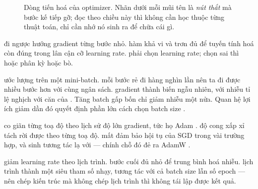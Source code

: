 \documentclass[../../../deep_learning.tex]{subfiles}
\begin{document}
\begin{figure}[H]\centering
{}
\caption{Dòng tiến hoá của optimizer. Nhãn dưới mỗi mũi tên là \emph{nút thắt} mà bước kế tiếp gỡ; đọc theo chiều này thì không cần học thuộc từng thuật toán, chỉ cần nhớ nó sinh ra để chữa cái gì.}
\label{fig:tien-hoa-opt}
\end{figure}

\begin{mach}
\item {} \gp đi ngược hướng gradient từng bước nhỏ. \gd hàm khả vi và trơn đủ để tuyến tính hoá còn đúng trong lân cận cỡ learning rate. \gia phải chọn learning rate; chọn sai thì hoặc phân kỳ hoặc bò.
\item {} \gp ước lượng trên một mini-batch. \hq mỗi bước rẻ đi hàng nghìn lần nên ta đi được nhiều bước hơn với cùng ngân sách. \vdm gradient thành biến ngẫu nhiên, với nhiễu tỉ lệ nghịch với căn của . Tăng batch gấp bốn chỉ giảm nhiễu một nửa. Quan hệ lợi ích giảm dần đó quyết định phần lớn cách chọn batch size \cite{smith2018dont}.
\item {} \gp co giãn từng toạ độ theo lịch sử độ lớn gradient, tức họ Adam \cite{kingma2015adam}. \gd độ cong xấp xỉ tách rời được theo từng toạ độ. \gia mất đảm bảo hội tụ của SGD trong vài trường hợp, và sinh tương tác lạ với  --- chính chỗ đó đẻ ra AdamW \cite{loshchilov2019adamw}.
\item {} \gp giảm learning rate theo lịch trình. \hq bước cuối đủ nhỏ để trung bình hoá nhiễu. \vdm lịch trình thành một siêu tham số nhạy, tương tác với cả batch size lẫn số epoch --- nên chép kiến trúc mà không chép lịch trình thì không tái lập được kết quả.
\end{mach}
\end{document}
